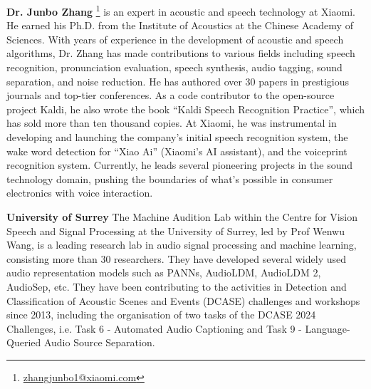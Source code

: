\documentclass{article}
\begin{document}
\textbf{Dr. Junbo Zhang} \footnote{\url{zhangjunbo1@xiaomi.com}} is an expert in acoustic and speech technology at Xiaomi. He earned his Ph.D. from the Institute of Acoustics at the Chinese Academy of Sciences. With years of experience in the development of acoustic and speech algorithms, Dr. Zhang has made contributions to various fields including speech recognition, pronunciation evaluation, speech synthesis, audio tagging, sound separation, and noise reduction.
He has authored over 30 papers in prestigious journals and top-tier conferences. As a code contributor to the open-source project Kaldi, he also wrote the book ``Kaldi Speech Recognition Practice'', which has sold more than ten thousand copies.
At Xiaomi, he was instrumental in developing and launching the company's initial speech recognition system, the wake word detection for ``Xiao Ai'' (Xiaomi's AI assistant), and the voiceprint recognition system. Currently, he leads several pioneering projects in the sound technology domain, pushing the boundaries of what's possible in consumer electronics with voice interaction.

\textbf{University of Surrey} The Machine Audition Lab within the Centre for Vision Speech and Signal Processing at the University of Surrey, led by Prof Wenwu Wang, is a leading research lab in audio signal processing and machine learning, consisting more than 30 researchers. They have developed several widely used audio representation models such as PANNs, AudioLDM, AudioLDM 2, AudioSep, etc. They have been contributing to the activities in Detection and Classification of Acoustic Scenes and Events (DCASE) challenges and workshops since 2013, including the organisation of two tasks of the DCASE 2024 Challenges, i.e. Task 6 - Automated Audio Captioning and Task 9 - Language-Queried Audio Source Separation. 
\end{document}
